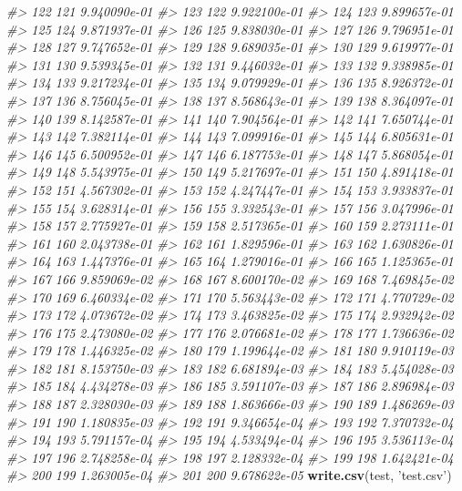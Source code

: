 \documentclass[]{article}
\newenvironment{Shaded}{\begin{snugshade}}{\end{snugshade}}
\newcommand{\CommentTok}[1]{\textcolor[rgb]{0.56,0.35,0.01}{\textit{#1}}}
\newcommand{\KeywordTok}[1]{\textcolor[rgb]{0.13,0.29,0.53}{\textbf{#1}}}
\newcommand{\NormalTok}[1]{#1}
\newcommand{\StringTok}[1]{\textcolor[rgb]{0.31,0.60,0.02}{#1}}
\begin{document}
\begin{Shaded}
\begin{Highlighting}[]
\CommentTok{#> 122 121 9.940090e-01}
\CommentTok{#> 123 122 9.922100e-01}
\CommentTok{#> 124 123 9.899657e-01}
\CommentTok{#> 125 124 9.871937e-01}
\CommentTok{#> 126 125 9.838030e-01}
\CommentTok{#> 127 126 9.796951e-01}
\CommentTok{#> 128 127 9.747652e-01}
\CommentTok{#> 129 128 9.689035e-01}
\CommentTok{#> 130 129 9.619977e-01}
\CommentTok{#> 131 130 9.539345e-01}
\CommentTok{#> 132 131 9.446032e-01}
\CommentTok{#> 133 132 9.338985e-01}
\CommentTok{#> 134 133 9.217234e-01}
\CommentTok{#> 135 134 9.079929e-01}
\CommentTok{#> 136 135 8.926372e-01}
\CommentTok{#> 137 136 8.756045e-01}
\CommentTok{#> 138 137 8.568643e-01}
\CommentTok{#> 139 138 8.364097e-01}
\CommentTok{#> 140 139 8.142587e-01}
\CommentTok{#> 141 140 7.904564e-01}
\CommentTok{#> 142 141 7.650744e-01}
\CommentTok{#> 143 142 7.382114e-01}
\CommentTok{#> 144 143 7.099916e-01}
\CommentTok{#> 145 144 6.805631e-01}
\CommentTok{#> 146 145 6.500952e-01}
\CommentTok{#> 147 146 6.187753e-01}
\CommentTok{#> 148 147 5.868054e-01}
\CommentTok{#> 149 148 5.543975e-01}
\CommentTok{#> 150 149 5.217697e-01}
\CommentTok{#> 151 150 4.891418e-01}
\CommentTok{#> 152 151 4.567302e-01}
\CommentTok{#> 153 152 4.247447e-01}
\CommentTok{#> 154 153 3.933837e-01}
\CommentTok{#> 155 154 3.628314e-01}
\CommentTok{#> 156 155 3.332543e-01}
\CommentTok{#> 157 156 3.047996e-01}
\CommentTok{#> 158 157 2.775927e-01}
\CommentTok{#> 159 158 2.517365e-01}
\CommentTok{#> 160 159 2.273111e-01}
\CommentTok{#> 161 160 2.043738e-01}
\CommentTok{#> 162 161 1.829596e-01}
\CommentTok{#> 163 162 1.630826e-01}
\CommentTok{#> 164 163 1.447376e-01}
\CommentTok{#> 165 164 1.279016e-01}
\CommentTok{#> 166 165 1.125365e-01}
\CommentTok{#> 167 166 9.859069e-02}
\CommentTok{#> 168 167 8.600170e-02}
\CommentTok{#> 169 168 7.469845e-02}
\CommentTok{#> 170 169 6.460334e-02}
\CommentTok{#> 171 170 5.563443e-02}
\CommentTok{#> 172 171 4.770729e-02}
\CommentTok{#> 173 172 4.073672e-02}
\CommentTok{#> 174 173 3.463825e-02}
\CommentTok{#> 175 174 2.932942e-02}
\CommentTok{#> 176 175 2.473080e-02}
\CommentTok{#> 177 176 2.076681e-02}
\CommentTok{#> 178 177 1.736636e-02}
\CommentTok{#> 179 178 1.446325e-02}
\CommentTok{#> 180 179 1.199644e-02}
\CommentTok{#> 181 180 9.910119e-03}
\CommentTok{#> 182 181 8.153750e-03}
\CommentTok{#> 183 182 6.681894e-03}
\CommentTok{#> 184 183 5.454028e-03}
\CommentTok{#> 185 184 4.434278e-03}
\CommentTok{#> 186 185 3.591107e-03}
\CommentTok{#> 187 186 2.896984e-03}
\CommentTok{#> 188 187 2.328030e-03}
\CommentTok{#> 189 188 1.863666e-03}
\CommentTok{#> 190 189 1.486269e-03}
\CommentTok{#> 191 190 1.180835e-03}
\CommentTok{#> 192 191 9.346654e-04}
\CommentTok{#> 193 192 7.370732e-04}
\CommentTok{#> 194 193 5.791157e-04}
\CommentTok{#> 195 194 4.533494e-04}
\CommentTok{#> 196 195 3.536113e-04}
\CommentTok{#> 197 196 2.748258e-04}
\CommentTok{#> 198 197 2.128332e-04}
\CommentTok{#> 199 198 1.642421e-04}
\CommentTok{#> 200 199 1.263005e-04}
\CommentTok{#> 201 200 9.678622e-05}
\KeywordTok{write.csv}\NormalTok{(test, }\StringTok{'test.csv'}\NormalTok{)}
\end{Highlighting}
\end{Shaded}
\end{document}
